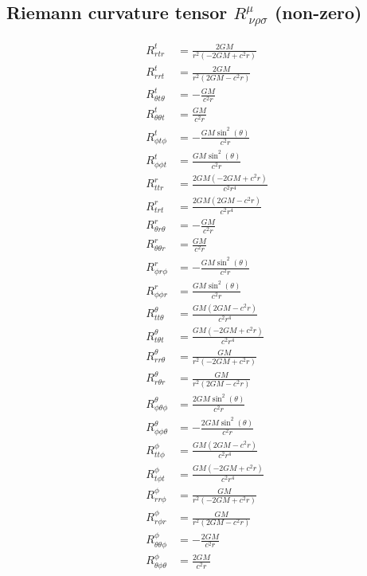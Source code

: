 \documentclass{article}
\begin{document}
\subsection{Riemann curvature tensor $R^{\mu}_{\ \nu\rho\sigma}$ (non-zero)}
\begin{align}
R^{t}_{r t r} &= \frac{2 G M}{r^{2} \left(- 2 G M + c^{2} r\right)} \\ 
R^{t}_{r r t} &= \frac{2 G M}{r^{2} \left(2 G M - c^{2} r\right)} \\ 
R^{t}_{\theta t \theta} &= - \frac{G M}{c^{2} r} \\ 
R^{t}_{\theta \theta t} &= \frac{G M}{c^{2} r} \\ 
R^{t}_{\phi t \phi} &= - \frac{G M \sin^{2}{\left(\theta \right)}}{c^{2} r} \\ 
R^{t}_{\phi \phi t} &= \frac{G M \sin^{2}{\left(\theta \right)}}{c^{2} r} \\ 
R^{r}_{t t r} &= \frac{2 G M \left(- 2 G M + c^{2} r\right)}{c^{2} r^{4}} \\ 
R^{r}_{t r t} &= \frac{2 G M \left(2 G M - c^{2} r\right)}{c^{2} r^{4}} \\ 
R^{r}_{\theta r \theta} &= - \frac{G M}{c^{2} r} \\ 
R^{r}_{\theta \theta r} &= \frac{G M}{c^{2} r} \\ 
R^{r}_{\phi r \phi} &= - \frac{G M \sin^{2}{\left(\theta \right)}}{c^{2} r} \\ 
R^{r}_{\phi \phi r} &= \frac{G M \sin^{2}{\left(\theta \right)}}{c^{2} r} \\ 
R^{\theta}_{t t \theta} &= \frac{G M \left(2 G M - c^{2} r\right)}{c^{2} r^{4}} \\ 
R^{\theta}_{t \theta t} &= \frac{G M \left(- 2 G M + c^{2} r\right)}{c^{2} r^{4}} \\ 
R^{\theta}_{r r \theta} &= \frac{G M}{r^{2} \left(- 2 G M + c^{2} r\right)} \\ 
R^{\theta}_{r \theta r} &= \frac{G M}{r^{2} \left(2 G M - c^{2} r\right)} \\ 
R^{\theta}_{\phi \theta \phi} &= \frac{2 G M \sin^{2}{\left(\theta \right)}}{c^{2} r} \\ 
R^{\theta}_{\phi \phi \theta} &= - \frac{2 G M \sin^{2}{\left(\theta \right)}}{c^{2} r} \\ 
R^{\phi}_{t t \phi} &= \frac{G M \left(2 G M - c^{2} r\right)}{c^{2} r^{4}} \\ 
R^{\phi}_{t \phi t} &= \frac{G M \left(- 2 G M + c^{2} r\right)}{c^{2} r^{4}} \\ 
R^{\phi}_{r r \phi} &= \frac{G M}{r^{2} \left(- 2 G M + c^{2} r\right)} \\ 
R^{\phi}_{r \phi r} &= \frac{G M}{r^{2} \left(2 G M - c^{2} r\right)} \\ 
R^{\phi}_{\theta \theta \phi} &= - \frac{2 G M}{c^{2} r} \\ 
R^{\phi}_{\theta \phi \theta} &= \frac{2 G M}{c^{2} r} \\ 
\end{align}
\end{document}
